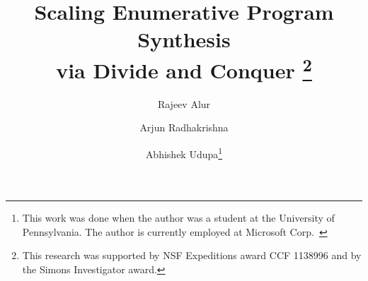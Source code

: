 \documentclass{llncs}
\newcommand\arsays[1]{{\color{red} \bf AR: #1}}
\begin{document}


\pagestyle{plain}
\title{
  \texorpdfstring{Scaling Enumerative Program Synthesis\\via
    Divide and Conquer}{Scaling Enumerative Program Synthesis via Divide and Conquer}
  \thanks{This research was supported by NSF Expeditions award CCF
  1138996 and by the Simons Investigator award.}
  }
\author{Rajeev Alur \and Arjun Radhakrishna \and Abhishek
Udupa\thanks{This work was done when the author was a student at the
University of Pennsylvania. The author is currently employed at Microsoft Corp.\ }
}
\maketitle
\end{document}
